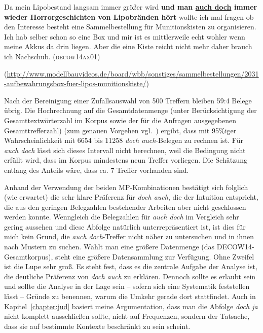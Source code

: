 {\begin{exe}
	\ex\label{842}

	Da mein Lipobestand langsam immer größer wird \textbf{und man \ul{auch doch} immer wieder Horrorgeschich\-ten von Lipobränden hört} wollte ich mal 	fragen ob den Interesse besteht eine Sammelbestellung für Munitionskisten zu organisieren. Ich hab selber schon so eine Box und mir ist es mittlerweile echt wohler wenn meine Akkus da drin liegen. Aber die eine Kiste reicht nicht mehr daher brauch ich Nachschub.						         
	\hfill\hbox{\scshape(decow14ax01)}
	\begin{sloppypar}
	{\scriptsize(\url{http://www.modellbauvideos.de/board/wbb/sonstiges/sammelbestellungen/2031-aufbewahrungsbox-fuer-lipos-munitionskiste/})}\end{sloppypar}
\end{exe}								
Nach der Bereinigung einer Zufallsauswahl von 500 Treffern bleiben 59:4 Belege übrig. Die Hochrechnung auf die Gesamtdatenmenge (unter Berücksichtigung der Gesamttextwörterzahl im Korpus sowie der für die Anfragen ausgegebenen Gesamttrefferzahl) (zum genauen Vorgehen vgl.\ \citealt[Kapitel 5.6]{Perkuhn2012}) ergibt, dass mit 95\%iger Wahrscheinlichkeit mit 6654 bis 11258 \textit{doch auch}-Belegen zu rechnen ist. Für \textit{auch doch} lässt sich dieses Intervall nicht berechnen, weil die Bedingung nicht erfüllt wird, dass im Korpus mindestens neun Treffer vorliegen. Die Schätzung entlang des Anteils wäre, dass ca. 7 Treffer vorhanden sind.\largerpage[2]

Anhand der Verwendung der beiden MP-Kom\-bi\-na\-ti\-on\-en bestätigt sich folg\-lich (wie erwartet) die sehr klare Präferenz für \textit{doch auch}, die der Intuition entspricht, die aus den geringen Belegzahlen bestehender Arbeiten aber nicht geschlossen werden konnte. Wenngleich die Belegzahlen für \textit{auch doch} im Vergleich sehr gering aussehen und diese Abfolge natürlich unterrepräsentiert ist, ist dies für mich kein Grund, die \textit{auch doch}-Treffer nicht näher zu untersuchen und in ihnen nach Mustern zu suchen. Wählt man eine größere Datenmenge (das DECOW14-Gesamtkorpus), steht eine größere Datensammlung zur Verfügung. Ohne Zweifel ist die Lupe sehr groß. Es steht fest, dass es die zentrale Aufgabe der Analyse ist, die deutliche Präferenz von \textit{doch auch} zu erklären. Dennoch sollte es erlaubt sein und sollte die Analyse in der Lage sein -- sofern sich eine Systematik feststellen lässt -- Gründe zu benennen, warum die Umkehr gerade dort stattfindet. Auch in Kapitel~\ref{chapter:jud} basiert meine Argumentation, dass man die Abfolge \textit{doch ja} nicht komplett ausschließen sollte, nicht auf Frequenzen, sondern der Tatsache, dass sie auf bestimmte Kontexte beschränkt zu sein scheint.

}
